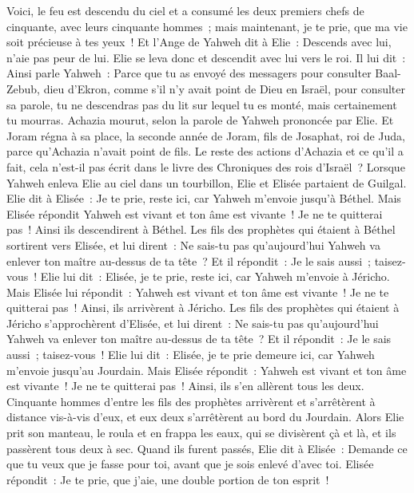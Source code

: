 \begin{multicols}{2}
Voici, le feu est descendu du ciel et a consumé les deux premiers chefs de cinquante, avec leurs cinquante hommes~; mais maintenant, je te prie, que ma vie soit précieuse à tes yeux~!
Et l'Ange de Yahweh dit à Elie~: Descends avec lui, n'aie pas peur de lui. Elie se leva donc et descendit avec lui vers le roi.
Il lui dit~: Ainsi parle Yahweh~: Parce que tu as envoyé des messagers pour consulter Baal-Zebub, dieu d'Ekron, comme s'il n'y avait point de Dieu en Israël, pour consulter sa parole, tu ne descendras pas du lit sur lequel tu es monté, mais certainement tu mourras.
Achazia mourut, selon la parole de Yahweh prononcée par Elie. Et Joram régna à sa place, la seconde année de Joram, fils de Josaphat, roi de Juda, parce qu'Achazia n'avait point de fils.
Le reste des actions d'Achazia et ce qu'il a fait, cela n'est-il pas écrit dans le livre des Chroniques des rois d'Israël~?
\VerseOne{}Lorsque Yahweh enleva Elie au ciel dans un tourbillon, Elie et Elisée partaient de Guilgal.
Elie dit à Elisée~: Je te prie, reste ici, car Yahweh m'envoie jusqu'à Béthel. Mais Elisée répondit Yahweh est vivant et ton âme est vivante~! Je ne te quitterai pas~! Ainsi ils descendirent à Béthel.
Les fils des prophètes qui étaient à Béthel sortirent vers Elisée, et lui dirent~: Ne sais-tu pas qu'aujourd'hui Yahweh va enlever ton maître au-dessus de ta tête~? Et il répondit~: Je le sais aussi~; taisez-vous~!
Elie lui dit~: Elisée, je te prie, reste ici, car Yahweh m'envoie à Jéricho. Mais Elisée lui répondit~: Yahweh est vivant et ton âme est vivante~! Je ne te quitterai pas~! Ainsi, ils arrivèrent à Jéricho.
Les fils des prophètes qui étaient à Jéricho s'approchèrent d'Elisée, et lui dirent~: Ne sais-tu pas qu'aujourd'hui Yahweh va enlever ton maître au-dessus de ta tête~? Et il répondit~: Je le sais aussi~; taisez-vous~!
Elie lui dit~: Elisée, je te prie demeure ici, car Yahweh m'envoie jusqu'au Jourdain. Mais Elisée répondit~: Yahweh est vivant et ton âme est vivante~! Je ne te quitterai pas~! Ainsi, ils s'en allèrent tous les deux.
Cinquante hommes d'entre les fils des prophètes arrivèrent et s'arrêtèrent à distance vis-à-vis d'eux, et eux deux s'arrêtèrent au bord du Jourdain.
Alors Elie prit son manteau, le roula et en frappa les eaux, qui se divisèrent çà et là, et ils passèrent tous deux à sec.
Quand ils furent passés, Elie dit à Elisée~: Demande ce que tu veux que je fasse pour toi, avant que je sois enlevé d'avec toi. Elisée répondit~: Je te prie, que j'aie, une double portion de ton esprit~!

\end{multicols}
